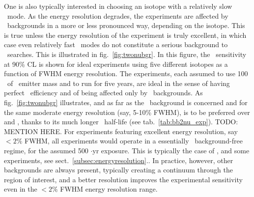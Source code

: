 One is also typically interested in choosing an isotope with a relatively slow \bbtnu\ mode. As the energy resolution degrades, the experiments are affected by \bbtnu\ backgrounds in a more or less pronounced way, depending on the isotope.  This is true unless the energy resolution of the experiment is truly excellent, in which case even relatively fast \bbtnu\ modes do not constitute a serious background to \bbonu\ searches. This is illustrated in fig.~\ref{fig:twonubgr}. In this figure, the \mbb\ sensitivity at 90\% CL is shown for ideal experiments using five different isotopes as a function of FWHM energy resolution. The experiments, each assumed to use 100 \kgbb\ of \bb\ emitter mass and to run for five years, are ideal in the sense of having perfect \bbonu\ efficiency and of being affected only by \bbtnu\ backgrounds. As fig.~\ref{fig:twonubgr} illustrates, and as far as the \bbtnu\ background is concerned and for the same moderate energy resolution (say, 5-10\% FWHM),  is to be preferred over  and , thanks to its much longer \bbtnu\ half-life (see tab.~\ref{tab:bb2nu_exp}). TODO: MENTION  HERE. For experiments featuring excellent energy resolution, say $<2\%$ FWHM, all experiments would operate in a essentially \bbtnu\ background-free regime, for the assumed 500 \kgbb$\cdot$yr exposure. This is typically the case of ,  and some  experiments, see sect.~\ref{subsec:energyresolution}.. In practice, however, other backgrounds are always present, typically creating a continuum through the region of interest, and a better resolution improves the experimental sensitivity even in the $<2\%$ FWHM energy resolution range.
